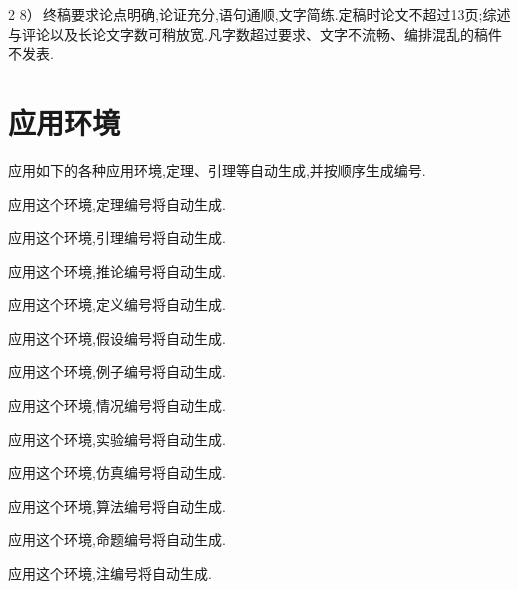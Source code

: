 \documentclass{ctacn}%
\begin{document}
\begin{multicols}{2}
8）\,终稿要求论点明确,论证充分,语句通顺,文字简练.定稿时论文不超过13页;综述与评论以及长论文字数可稍放宽.\;凡字数超过要求、文字不流畅、编排混乱的稿件不发表.

\section{应用环境}
应用如下的各种应用环境,定理、引理等自动生成,并按顺序生成编号.

\begin{dingli}
	应用这个环境,定理编号将自动生成.
\end{dingli}

\begin{yinli}
	应用这个环境,引理编号将自动生成.
\end{yinli}

\begin{tuilun}
	应用这个环境,推论编号将自动生成.
\end{tuilun}

\begin{dingyi}
	应用这个环境,定义编号将自动生成.
\end{dingyi}

\begin{jiashe}
	应用这个环境,假设编号将自动生成.
\end{jiashe}

\begin{li}
	应用这个环境,例子编号将自动生成.
\end{li}

\begin{qingkuang}
	应用这个环境,情况编号将自动生成.
\end{qingkuang}

\begin{shiyan}
	应用这个环境,实验编号将自动生成.
\end{shiyan}

\begin{fangzhen}
	应用这个环境,仿真编号将自动生成.
\end{fangzhen}

\begin{suanfa}
	应用这个环境,算法编号将自动生成.
\end{suanfa}


\begin{mingti}
	应用这个环境,命题编号将自动生成.
\end{mingti}

\begin{zhu}
	应用这个环境,注编号将自动生成.
\end{zhu}


\end{multicols}
\end{document}
